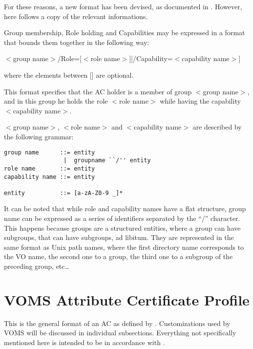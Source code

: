 \documentclass[a4]{article}
\begin{document}
For these reasons, a new format has been devised, as documented in
\cite{fqan}.  However, here follows a copy of the relevant informations.

Group membership, Role holding and Capabilities may be expressed in a
format that bounds them together in the following way:

\begin{center}
$<$group name$>$/Role=[$<$role name$>$][/Capability=$<$capability name$>$]
\end{center}

where the elements between [] are optional.

This format specifies that the AC holder is a member of group $<$group
name$>$, and in this group he holds the role $<$role name$>$ while
having the capability $<$capability name$>$.

$<$group name$>$, $<$role name$>$ and $<$capability name$>$ are
described by the following grammar:

\begin{verbatim}
group name      ::= entity
                 |  groupname ``/'' entity
role name       ::= entity
capability name ::= entity

entity          ::= [a-zA-Z0-9 _]*
\end{verbatim}

It can be noted that while role and capability names have a flat
structure, group name can be expressed as a series of identifiers
separated by the ``/'' character.  This happens because groups are a
structured entities, where a group can have subgroups, that can have
subgroups, ad libitum.  They are represented in the same format as
Unix path names, where the first directory name corresponds to the VO
name, the second one to a group, the third one to a subgroup of the
preceding group, etc\ldots

\section{VOMS Attribute Certificate Profile}

This is the general format of an AC as defined by \cite{rfc3281}.
Customizations used by VOMS will be discussed in individual
subsections.  Everything not specifically mentioned here is intended
to be in accordance with \cite{rfc3281}.
\end{document}
